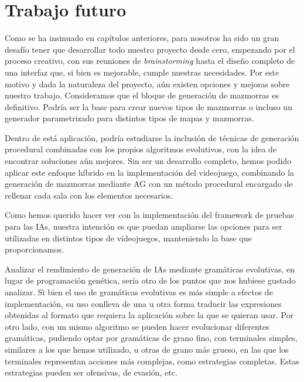 \section{Trabajo futuro}
Como se ha insinuado en cap\'itulos anteriores, para nosotros ha sido un gran desaf\'io tener que desarrollar todo nuestro proyecto desde cero, empezando por el proceso creativo, con sus reuniones de \textit{brainstorming} hasta el dise\~no completo de una interfaz que, si bien es mejorable, cumple nuestras necesidades. Por este motivo y dada la naturaleza del proyecto, a\'un existen opciones y mejoras sobre nuestro trabajo. Consideramos que el bloque de generaci\'on de mazmorras es definitivo. Podr\'ia ser la base para crear nuevos tipos de mazmorras o incluso un generador parametrizado para distintos tipos de mapas y mazmorras.\par
Dentro de est\'a aplicaci\'on, podr\'ia estudiarse la inclusi\'on de t\'ecnicas de generaci\'on procedural combinadas con los propios algoritmos evolutivos, con la idea de encontrar soluciones a\'un mejores. Sin ser un desarrollo completo, hemos podido aplicar este enfoque h\'ibrido en la implementaci\'on del videojuego, combinando la generaci\'on de mazmorras mediante AG con un m\'etodo procedural encargado de rellenar cada sala con los elementos necesarios.\par
Como hemos querido hacer ver con la implementaci\'on del framework de pruebas para las IAs, nuestra intenci\'on es que puedan ampliarse las opciones para ser utilizadas en distintos tipos de videojuegos, manteniendo la base que proporcionamos.\par
Analizar el rendimiento de generaci\'on de IAs mediante gram\'aticas evolutivas, en lugar de programaci\'on gen\'etica, ser\'ia otro de los puntos que nos hubiese gustado analizar. Si bien el uso de gram\'aticas evolutivas es m\'as simple a efectos de implementaci\'on, su uso conlleva de una u otra forma traducir las expresiones obtenidas al formato que requiera la aplicaci\'on sobre la que se quieran usar. Por otro lado, con un mismo algoritmo se pueden hacer evolucionar diferentes gram\'aticas, pudiendo optar por gram\'aticas de grano fino, con terminales simples, similares a los que hemos utilizado, u otras de grano m\'as grueso, en las que los terminales representan acciones m\'as complejas, como estrategias completas. Estas estrategias pueden ser ofensivas, de evasi\'on, etc.\par
